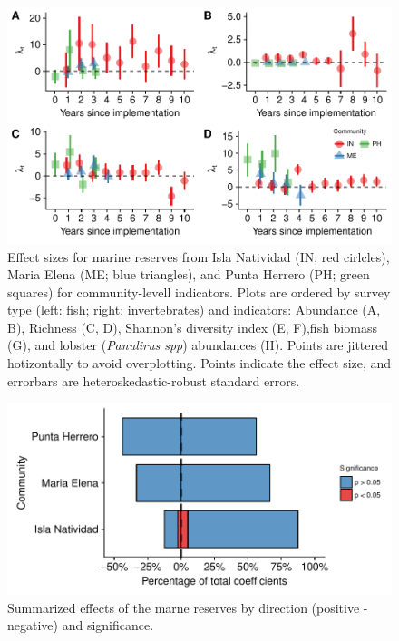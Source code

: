 \documentclass{frontiersSCNS}
\theoremstyle{definition}
\theoremstyle{definition}
\theoremstyle{definition}
\theoremstyle{remark}
\begin{document}
\clearpage

\begin{figure}
\centering
\includegraphics{Villasenor-Derbez_files/figure-latex/unnamed-chunk-5-1.pdf}
\caption{\label{fig:unnamed-chunk-5}\label{fig:indicators}Effect sizes for
marine reserves from Isla Natividad (IN; red cirlcles), Maria Elena (ME;
blue triangles), and Punta Herrero (PH; green squares) for
community-levell indicators. Plots are ordered by survey type (left:
fish; right: invertebrates) and indicators: Abundance (A, B), Richness
(C, D), Shannon's diversity index (E, F),fish biomass (G), and lobster
(\emph{Panulirus spp}) abundances (H). Points are jittered hotizontally
to avoid overplotting. Points indicate the effect size, and errorbars
are heteroskedastic-robust standard errors.}
\end{figure}

\begin{figure}
\centering
\includegraphics{Villasenor-Derbez_files/figure-latex/unnamed-chunk-6-1.pdf}
\caption{\label{fig:unnamed-chunk-6}\label{fig:res_com}Summarized effects of
the marne reserves by direction (positive - negative) and significance.}
\end{figure}
\end{document}
